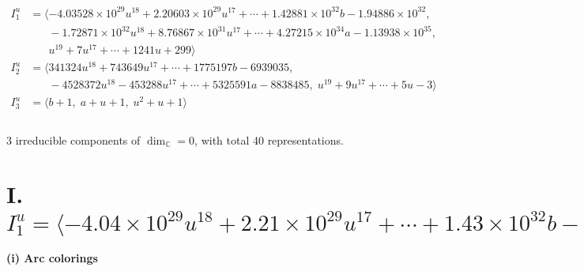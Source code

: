 \documentclass[1p]{elsarticle_modified}
\theoremstyle{definition}
\begin{document}
\begin{align*}
I^u_{1}&=\langle 
-4.03528\times10^{29} u^{18}+2.20603\times10^{29} u^{17}+\cdots+1.42881\times10^{32} b-1.94886\times10^{32},\\
\phantom{I^u_{1}}&\phantom{= \langle  }-1.72871\times10^{32} u^{18}+8.76867\times10^{31} u^{17}+\cdots+4.27215\times10^{34} a-1.13938\times10^{35},\\
\phantom{I^u_{1}}&\phantom{= \langle  }u^{19}+7 u^{17}+\cdots+1241 u+299\rangle \\
I^u_{2}&=\langle 
341324 u^{18}+743649 u^{17}+\cdots+1775197 b-6939035,\\
\phantom{I^u_{2}}&\phantom{= \langle  }-4528372 u^{18}-453288 u^{17}+\cdots+5325591 a-8838485,\;u^{19}+9 u^{17}+\cdots+5 u-3\rangle \\
I^u_{3}&=\langle 
b+1,\;a+u+1,\;u^2+u+1\rangle \\
\\
\end{align*}
\raggedright * 3 irreducible components of $\dim_{\mathbb{C}}=0$, with total 40 representations.\\
\newpage
\renewcommand{\arraystretch}{1}
\centering \section*{I. $I^u_{1}= \langle -4.04\times10^{29} u^{18}+2.21\times10^{29} u^{17}+\cdots+1.43\times10^{32} b-1.95\times10^{32},\;-1.73\times10^{32} u^{18}+8.77\times10^{31} u^{17}+\cdots+4.27\times10^{34} a-1.14\times10^{35},\;u^{19}+7 u^{17}+\cdots+1241 u+299 \rangle$}
\flushleft \textbf{(i) Arc colorings}\\
\end{document}
